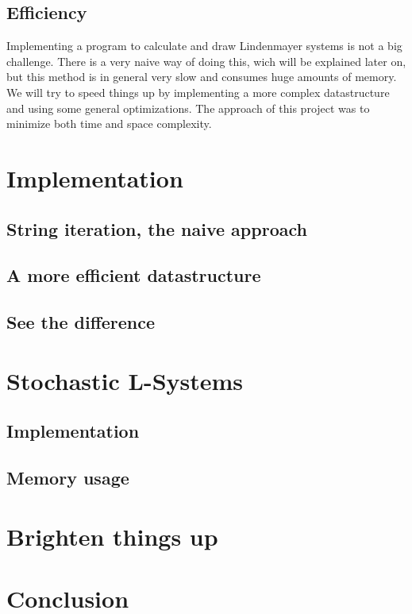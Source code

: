 \documentclass[11pt,a4paper]{article}
\begin{document}
\subsection{Efficiency} %
Implementing a program to calculate and draw Lindenmayer systems is not a big challenge. There is a very naive way of doing this, wich will be explained later on, but this method is in general very slow and consumes huge amounts of memory. We will try to speed things up by implementing a more complex datastructure and using some general optimizations. The approach of this project was to minimize both time and space complexity.

\section{Implementation}
\subsection{String iteration, the naive approach}
\subsection{A more efficient datastructure} %
\subsection{See the difference} %

\section{Stochastic L-Systems} %
\subsection{Implementation}
\subsection{Memory usage}

\section{Brighten things up} %

\section{Conclusion}

\newpage
\begin{appendix}
\listoffigures
\end{appendix}
\end{document}
